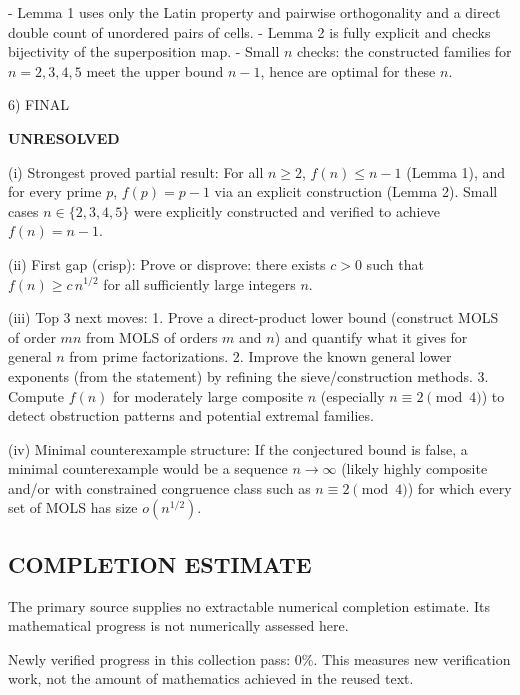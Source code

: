 - Lemma 1 uses only the Latin property and pairwise orthogonality and a direct double count of unordered pairs of cells.
- Lemma 2 is fully explicit and checks bijectivity of the superposition map.
- Small $n$ checks: the constructed families for $n=2,3,4,5$ meet the upper bound $n-1$, hence are optimal for these $n$.

6) FINAL

\textbf{UNRESOLVED}

(i) Strongest proved partial result: For all $n\ge 2$, $f(n)\le n-1$ (Lemma 1), and for every prime $p$, $f(p)=p-1$ via an explicit construction (Lemma 2). Small cases $n\in\{2,3,4,5\}$ were explicitly constructed and verified to achieve $f(n)=n-1$.

(ii) First gap (crisp): Prove or disprove: there exists $c>0$ such that $f(n)\ge c\,n^{1/2}$ for all sufficiently large integers $n$.

(iii) Top 3 next moves:
  1. Prove a direct-product lower bound (construct MOLS of order $mn$ from MOLS of orders $m$ and $n$) and quantify what it gives for general $n$ from prime factorizations.
  2. Improve the known general lower exponents (from the statement) by refining the sieve/construction methods.
  3. Compute $f(n)$ for moderately large composite $n$ (especially $n\equiv 2\pmod 4$) to detect obstruction patterns and potential extremal families.

(iv) Minimal counterexample structure: If the conjectured bound is false, a minimal counterexample would be a sequence $n\to\infty$ (likely highly composite and/or with constrained congruence class such as $n\equiv 2\pmod 4$) for which every set of MOLS has size $o(n^{1/2})$.




\subsection*{COMPLETION ESTIMATE}
The primary source supplies no extractable numerical completion estimate. Its mathematical progress is not numerically assessed here.

Newly verified progress in this collection pass: $0\%$. This measures new verification work, not the amount of mathematics achieved in the reused text.
